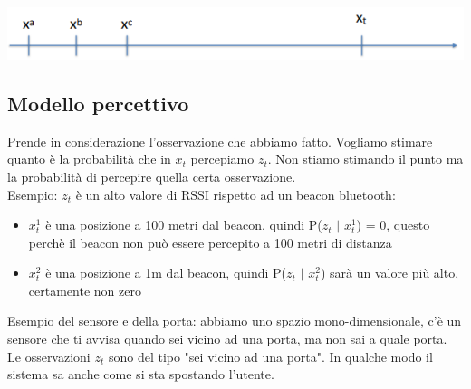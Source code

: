 \begin{center}
    \includegraphics[width=.9\textwidth]{images/MobiDEV/2. tecniche di aggregazione di dati soggetti a rumore/modello di transizione di stato.PNG} \\
\end{center}

\subsection{Modello percettivo}
Prende in considerazione l'osservazione che abbiamo fatto. 
Vogliamo stimare quanto è la probabilità che in $x_t$ percepiamo $z_t$. Non stiamo stimando il punto ma la probabilità di percepire quella certa osservazione.
\\ Esempio: $z_t$ è un alto valore di RSSI rispetto ad un beacon bluetooth:
\begin{itemize}
    \item $x_t^1$ è una posizione a 100 metri dal beacon, quindi P($z_t$ $|$ $x_t^1$) = 0, questo perchè il beacon non può essere percepito a 100 metri di distanza
    \item $x_t^2$ è una posizione a 1m dal beacon, quindi P($z_t$ $|$ $x_t^2$) sarà un valore più alto, certamente non zero 
\end{itemize}

Esempio del sensore e della porta:
abbiamo uno spazio mono-dimensionale, c'è un sensore che ti avvisa quando sei vicino ad una porta, ma non sai a quale porta. Le osservazioni $z_t$ sono del tipo "sei vicino ad una porta".
In qualche modo il sistema sa anche come si sta spostando l'utente. 

